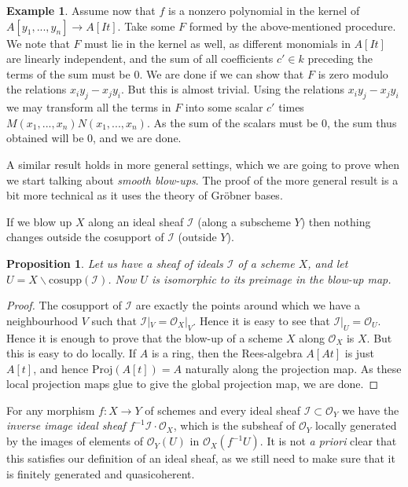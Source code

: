 \documentclass[12pt,a4paper,leqno]{article}
\newcommand{\OO}{\mathcal{O}}
\newcommand{\proj}{\mathrm{Proj}}
\newcommand{\cosupp}{\mathrm{cosupp}}
\theoremstyle{plain}
\newtheorem{prop}[theo]{Proposition}
\theoremstyle{definition}
\newtheorem{ex}[theo]{Example}
\theoremstyle{remark}
\begin{document}
\begin{ex}
Assume now that $f$ is a nonzero polynomial in the kernel of $A[y_1,...,y_n] \to A[It]$. Take some $F$ formed by the above-mentioned procedure. We note that $F$ must lie in the kernel as well, as different monomials in $A[It]$ are linearly independent, and the sum of all coefficients $c' \in k$ preceding the terms of the sum must be 0. We are done if we can show that $F$ is zero modulo the relations $x_i y_j - x_j y_i$. But this is almost trivial. Using the relations $x_i y_j - x_j y_i$ we may transform all the terms in $F$ into some scalar $c'$ times $M(x_1,...,x_n)N(x_1,...,x_n)$. As the sum of the scalars must be 0, the sum thus obtained will be 0, and we are done.

A similar result holds in more general settings, which we are going to prove when we start talking about \emph{smooth blow-ups}. The proof of the more general result is a bit more technical as it uses the theory of Gröbner bases. 
\end{ex}

If we blow up $X$ along an ideal sheaf $\mathscr{I}$ (along a subscheme $Y$) then nothing changes outside the cosupport of $\mathscr{I}$ (outside $Y$).

\begin{prop}
Let us have a sheaf of ideals $\mathscr{I}$ of a scheme $X$, and let $U = X \backslash \cosupp (\mathscr{I})$. Now $U$ is isomorphic to its preimage in the blow-up map. 
\end{prop}
\begin{proof}
The cosupport of $\mathscr{I}$ are exactly the points around which we have a neighbourhood $V$ such that $\mathscr{I} |_V  = \OO_X |_V$. Hence it is easy to see that $\mathscr{I}|_U = \OO_U$. Hence it is enough to prove that the blow-up of a scheme $X$ along $\OO_X$ is $X$. But this is easy to do locally. If $A$ is a ring, then the Rees-algebra $A[At]$ is just $A[t]$, and hence $\proj (A[t]) = A$ naturally along the projection map. As these local projection maps glue to give the global projection map, we are done.
\end{proof}

For any morphism $f: X \to Y$ of schemes and every ideal sheaf $\mathscr{I} \subset \OO_Y$ we have the \emph{inverse image ideal sheaf} $f^{-1} \mathscr{I} \cdot \OO_X$, which is the subsheaf of $\OO_Y$ locally generated by the images of elements of $\OO_Y (U)$ in $\OO_X (f^{-1} U)$. It is not \emph{a priori} clear that this satisfies our definition of an ideal sheaf, as we still need to make sure that it is finitely generated and quasicoherent.
\end{document}
